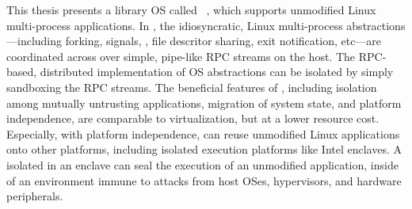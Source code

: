 This thesis presents a library OS called \graphene{}~\cite{tsai14graphene},
which supports unmodified Linux multi-process applications.
In \graphene{},
the idiosyncratic, Linux multi-process abstractions---including forking, signals, \sysvipc{}, file descritor sharing, exit notification, etc---are coordinated
across \picoprocs{}
over simple, pipe-like RPC streams on the host.
The RPC-based, distributed implementation of OS abstractions
can be isolated by simply sandboxing the RPC streams.
The beneficial features of \graphene{}, %
including isolation among mutually untrusting applications,
migration of system state,
and platform independence,
are comparable to virtualization,
but at a lower resource cost.
Especially, with platform independence, \graphene{}
can reuse unmodified Linux applications
onto other platforms,
including isolated execution platforms like Intel \sgx{} enclaves.
A \graphene{} \picoproc{} isolated in an enclave
can seal the execution of an unmodified application,
inside of an environment immune to attacks from host OSes, hypervisors,
and hardware peripherals.




